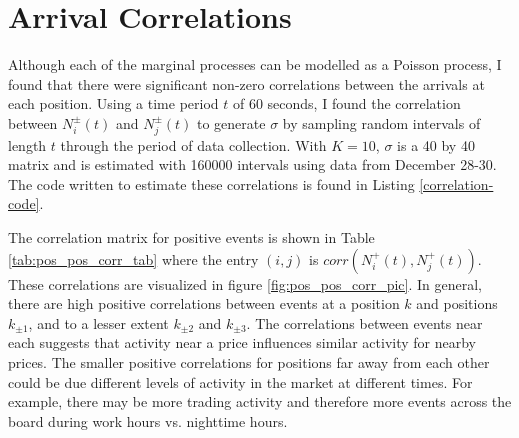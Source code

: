 \section{Arrival Correlations}\label{ch:correlations}
Although each of the marginal processes can be modelled as a Poisson process, I found that there were significant non-zero correlations between the arrivals at each position. Using a time period $t$ of 60 seconds, I found the correlation between $N^{\pm}_i(t)$ and $N^{\pm}_j(t)$ to generate $\sigma$ by sampling random intervals of length $t$ through the period of data collection. With $K=10$, $\sigma$ is a 40 by 40 matrix and is estimated with 160000 intervals using data from December 28-30. The code written to estimate these correlations is found in Listing \ref{correlation-code}.

The correlation matrix for positive events is shown in Table \ref{tab:pos_pos_corr_tab} where the entry $(i,j)$ is $corr(N^{+}_i(t), N^{+}_j(t))$. These correlations are visualized in figure \ref{fig:pos_pos_corr_pic}. In general, there are high positive correlations between events at a position $k$ and positions $k_{\pm 1}$, and to a lesser extent $k_{\pm 2}$ and $k_{\pm 3}$. The correlations between events near each suggests that activity near a price influences similar activity for nearby prices. The smaller positive correlations for positions far away from each other could be due different levels of activity in the market at different times. For example, there may be more trading activity and therefore more events across the board during work hours vs. nighttime hours.

